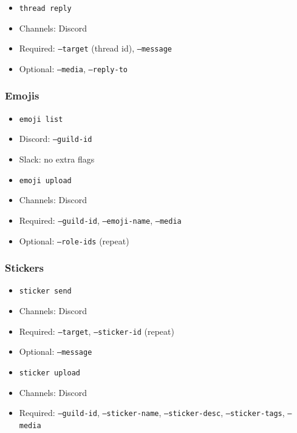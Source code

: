 \begin{itemize}
  \item \texttt{thread reply}
  \item Channels: Discord
  \item Required: \texttt{--target} (thread id), \texttt{--message}
  \item Optional: \texttt{--media}, \texttt{--reply-to}
\end{itemize}


\subsubsection{Emojis}


\begin{itemize}
  \item \texttt{emoji list}
  \item Discord: \texttt{--guild-id}
  \item Slack: no extra flags
\end{itemize}


\begin{itemize}
  \item \texttt{emoji upload}
  \item Channels: Discord
  \item Required: \texttt{--guild-id}, \texttt{--emoji-name}, \texttt{--media}
  \item Optional: \texttt{--role-ids} (repeat)
\end{itemize}


\subsubsection{Stickers}


\begin{itemize}
  \item \texttt{sticker send}
  \item Channels: Discord
  \item Required: \texttt{--target}, \texttt{--sticker-id} (repeat)
  \item Optional: \texttt{--message}
\end{itemize}


\begin{itemize}
  \item \texttt{sticker upload}
  \item Channels: Discord
  \item Required: \texttt{--guild-id}, \texttt{--sticker-name}, \texttt{--sticker-desc}, \texttt{--sticker-tags}, \texttt{--media}
\end{itemize}


